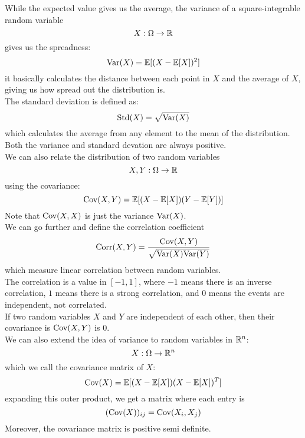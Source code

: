 \documentclass[12pt]{article}
\begin{document}
    While the expected value gives us the average,
    the variance of a square-integrable
    random variable
    \[ X: \Omega \to \mathbb{R} \]
    gives us the spreadness:
    \[ \text{Var}(X) = \mathbb{E}[(X - \mathbb{E}[X])^2] \]
    it basically calculates the distance
    between each point in $X$
    and the average of $X$,
    giving us how spread out the
    distribution is. \\
    The standard deviation is defined as:
    \[ \text{Std}(X) = \sqrt{\text{Var}(X)} \]
    which calculates the average
    from any element to the mean of the
    distribution. \\
    Both the variance and standard devation
    are always positive. \\

    We can also relate the distribution
    of two random variables
    \[ X, Y: \Omega \to \mathbb{R} \]
    using the covariance:
    \[ \text{Cov}(X, Y) = 
    \mathbb{E}[(X - \mathbb{E}[X])(Y - \mathbb{E}[Y])] \]
    Note that $\text{Cov}(X, X)$
    is just the variance $\text{Var}(X)$. \\

    We can go further and define
    the correlation coefficient
    \[ \text{Corr}(X, Y) = \dfrac{\text{Cov}(X, Y)}
    {\sqrt{\text{Var}(X)\text{Var}(Y)}} \]
    which measure linear correlation
    between random variables. \\
    The correlation is a value in $[-1, 1]$,
    where $-1$ means there is an inverse
    correlation, $1$ means there is a
    strong correlation, and $0$
    means the events are independent,
    not correlated. \\

    If two random variables $X$ and $Y$
    are independent of each other,
    then their covariance is $\text{Cov}(X, Y)$
    is $0$. \\
    
    We can also extend the idea of variance
    to random variables in $\mathbb{R}^n$:
    \[ X: \Omega \to \mathbb{R}^n \]
    which we call the covariance matrix
    of $X$:
    \[ \text{Cov}(X) = 
    \mathbb{E}[(X - \mathbb{E}[X])(X - \mathbb{E}[X])^T] \]
    expanding this outer product,
    we get a matrix where each entry is
    \[ (\text{Cov}(X))_{ij} = \text{Cov}(X_i, X_j) \]
    Moreover, the covariance matrix
    is positive semi definite. \\
\end{document}
